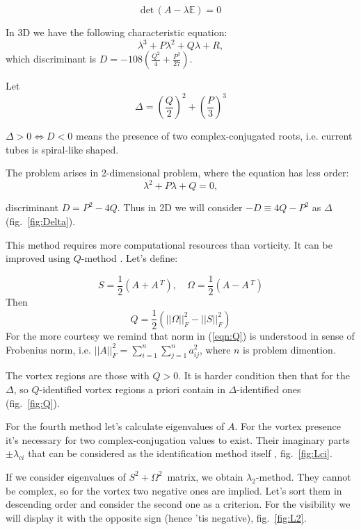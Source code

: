 \documentclass[a4wide,fontsize=12pt]{article}
\begin{document}
\begin{equation}
  \text{det} \,( A -\lambda \mathbb E)=0
\end{equation}  

In 3D we have the following characteristic equation: $$\lambda^3+P\lambda^2+Q\lambda+R,$$ \noindent which discriminant is $D=-108\left( \frac{Q^2}{4} +\frac{P^3}{27}\right)$. 


Let $$\Delta=\left(\frac{Q}{2}\right)^2 +\left(\frac{P}{3}\right)^3$$

$ \Delta > 0  \Leftrightarrow  D < 0$ means the presence of two complex-conjugated roots, i.e. current tubes is spiral-like shaped.

The problem arises in 2-dimensional problem, where the equation has less order:
$$\lambda^2+P\lambda+Q=0,$$

discriminant $D=P^2-4Q$. Thus in 2D we will consider $-D\equiv 4Q-P^2$ as $\Delta$ (fig.~\ref{fig:Delta}).

This method requires more computational resources than vorticity. It can be improved using $Q$-method \cite{vortex}\cite{Hussain}. Let's define:

\begin{equation}
 S=\frac{1}{2}\left(A +A\,^T \right) ,\quad \Omega=\frac{1}{2} \left( A - A\,^T\right) 
  \label{NSdim}
\end{equation}
Then
\begin{equation}
  Q=\frac{1}{2} \left( ||\Omega||^2_F-||S||^2_F \right) 
  \label{eqn:Q}
 \end{equation}
For the more courtesy we remind that norm in (\ref{eqn:Q}) is understood in sense of Frobenius norm, i.e. $||A||^2_F=\sum \limits_{i=1}^n \sum \limits_{j=1}^n a_{ij}^2$, where $n$ is problem dimention.

The vortex regions are those with $Q>0$. It is harder condition then that for the $\Delta$, so $Q$-identified vortex regions a priori contain in $\Delta$-identified ones (fig.~\ref{fig:Q}).

For the fourth method let's calculate eigenvalues of $A$. For the vortex presence it's necessary for two complex-conjugation values to exist. Their imaginary parts $\pm\lambda_{ci}$ that can be considered as the identification method itself \cite{vortex}, fig.~\ref{fig:Lci}.

If we consider eigenvalues of $S^2+\Omega^2$~matrix, we obtain $\lambda_2$-method. They cannot be complex, so for the vortex two negative ones are implied. Let's sort them in descending order and consider the second one as a criterion\cite{vortex,Hussain}. For the visibility we will display it with the opposite sign (hence 'tis negative), fig.~\ref{fig:L2}.
\end{document}
